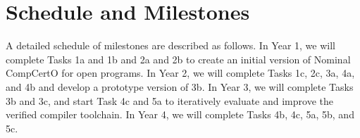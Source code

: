 \section{Schedule and Milestones}

A detailed schedule of milestones are described as follows. In Year 1, 
we will complete Tasks 1a and 1b and 2a and 2b to 
create an initial version of Nominal CompCertO for open programs.
In Year 2, we will complete Tasks 1c, 2c, 3a, 4a, and 4b and
develop a prototype version of 3b. In Year 3, 
we will complete Tasks 3b and 3c, and start Task 4c and 5a to
iteratively evaluate and improve the verified compiler toolchain.
In Year 4, we will complete Tasks 4b, 4c, 5a, 5b, and 5c.


